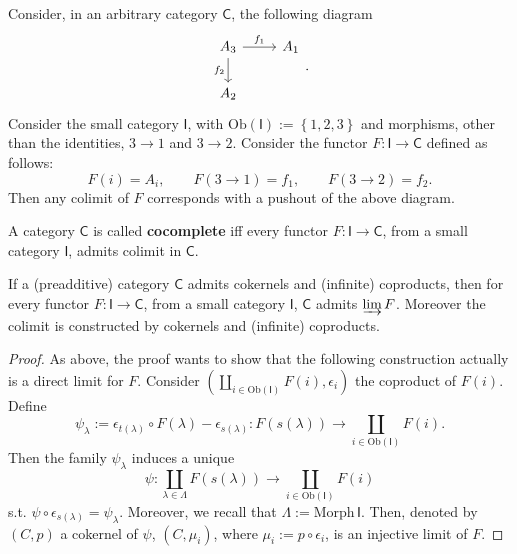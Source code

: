 \begin{ex}
	Consider, in an arbitrary category $\mathsf{C}$, the following diagram
	\begin{equation}
	\begin{tikzcd}
		A_3 \arrow[r, "f_1", rightarrow] \arrow[d, "f_2"', rightarrow] &
		A_1\\
		A_2
	\end{tikzcd}
	.\end{equation} 
	Consider the small category $\mathsf{I}$, with $\mathrm{Ob} \left(\mathsf{I}\right) := \left\{ 1, 2, 3 \right\}$ and morphisms, other than the identities, $3 \to 1$ and $3 \to 2$.
	Consider the functor $F: \mathsf{I} \to \mathsf{C}$ defined as follows:
	\begin{equation}
		F(i) = A_i, \qquad F( 3 \to 1 ) = f_1, \qquad
		F( 3 \to 2 ) = f_2
	.\end{equation} 
	Then any colimit of $F$ corresponds with a pushout of the above diagram.
\end{ex} 

\begin{defn}
	A category $\mathsf{C}$ is called \textbf{cocomplete} iff every functor $F: \mathsf{I} \to \mathsf{C}$, from a small category $\mathsf{I}$, admits colimit in $\mathsf{C}$.
\end{defn}

\begin{prop}\label{prop:ColimConstr}
	If a (preadditive) category $\mathsf{C}$ admits cokernels and (infinite) coproducts, then
	for every functor $F: \mathsf{I} \to \mathsf{C}$, from a small category $\mathsf{I}$, $\mathsf{C}$ admits $\varinjlim F$.
	Moreover the colimit is constructed by cokernels and (infinite) coproducts.
\end{prop} 
\begin{proof}
	As above, the proof wants to show that the following construction actually is a direct limit for $F$.
	Consider $\left(\coprod_{i \in \mathrm{Ob} \left(\mathsf{I}\right)} F(i), \epsilon_i\right)$ the coproduct of $F(i)$.
	Define
	\begin{equation}
		\psi_\lambda := \epsilon_{t(\lambda)} \circ F(\lambda) - \epsilon_{s(\lambda)}:
		F \left( s(\lambda)  \right) \to \coprod_{i \in \mathrm{Ob} \left(\mathsf{I}\right)} F(i)
	.\end{equation} 
	Then the family $\psi_\lambda$ induces a unique 
	\begin{equation}
		\psi: \coprod_{\lambda \in \Lambda} F \left( s(\lambda) \right) \to \coprod_{i \in \mathrm{Ob} \left(\mathsf{I}\right)} F(i)
	\end{equation} 
	s.t. $\psi \circ \epsilon_{s(\lambda)} = \psi_\lambda$.
	Moreover, we recall that $\Lambda := \mathrm{Morph}\, \mathsf{I}$.
	Then, denoted by $\left(C, p\right)$ a cokernel of $\psi$, $\left(C, \mu_i\right)$, where $\mu_i := p \circ\epsilon_i$, is an injective limit of $F$.
\end{proof}

